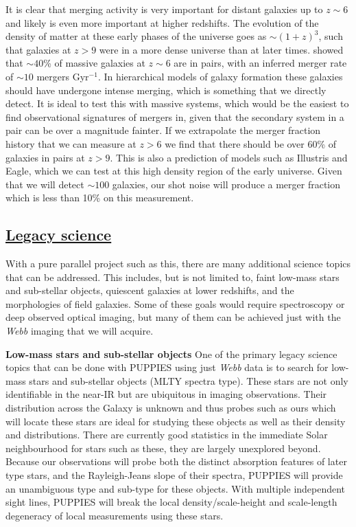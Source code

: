 \documentclass[12pt]{article}
\begin{document}
It is clear that merging activity is very important for distant galaxies up to $z \sim 6$ and likely is even more important at higher redshifts.  The evolution of the density of matter at these early phases of the universe goes as $\sim (1+z)^{3}$, such that galaxies at $z > 9$ were in a more dense universe than at later times.  \citet{Duncan2019} showed that $\sim 40$\% of massive galaxies at $z \sim 6$ are in pairs, with an inferred merger rate of $\sim 10$ mergers Gyr$^{-1}$.  In hierarchical models of galaxy formation these galaxies should have undergone intense merging, which is something that we directly detect. It is ideal to test this with massive systems, which would be the easiest to find observational signatures of mergers in, given that the secondary system in a pair can be over a magnitude fainter.  If we extrapolate the merger fraction history that we can measure at $z > 6$ we find that there should be over 60\% of galaxies in pairs at $z > 9$.  This is also a prediction of models such as Illustris and Eagle, which we can test at this high density region of the early universe.  Given that we will detect $\sim 100$ galaxies, our shot noise will produce a merger fraction which is less than 10\% on this measurement.  




\subsection*{\bf \underline{Legacy science}}

With a pure parallel project such as this, there are many additional science topics that can be addressed.  This includes, but is not limited to, faint low-mass stars and sub-stellar objects, quiescent galaxies at lower redshifts, and the morphologies of field galaxies. Some of these goals would require spectroscopy or deep observed optical imaging, but many of them can be achieved just with the \emph{Webb} imaging that we will acquire.

\vspace{2mm}
\noindent
\textbf{Low-mass stars and sub-stellar objects} One of the primary legacy science topics that can be done with PUPPIES using just \emph{Webb} data is to search for low-mass stars and sub-stellar objects (MLTY spectra type). These stars are not only identifiable in the near-IR but are ubiquitous in imaging observations.  Their distribution across the Galaxy is unknown and thus probes such as ours which will locate these stars are ideal for studying these objects as well as their density and distributions. There are currently good statistics in the immediate Solar neighbourhood for stars such as these, they are largely unexplored beyond. Because our observations will probe both the distinct absorption features of later type stars, and the Rayleigh-Jeans slope of their spectra,  PUPPIES will provide an unambiguous type and sub-type for these objects. With multiple independent sight lines, PUPPIES will break the local density/scale-height and scale-length degeneracy of local measurements using these stars.
\end{document}
